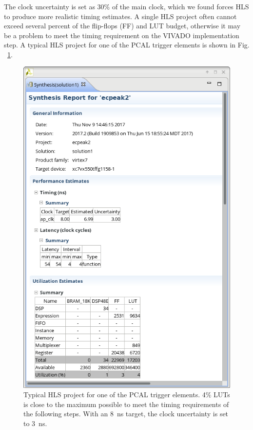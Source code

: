 The clock uncertainty is set as 30\% of the main clock, which we found forces HLS to produce more realistic
timing estimates. A single HLS project often cannot exceed several percent of the flip-flops (FF) and LUT
budget, otherwise it may be a problem to meet the timing requirement on the VIVADO implementation step.
A typical HLS project for one of the PCAL trigger elements is shown in Fig. ~\ref{fig:hls}.

\begin{figure}[hbt]
	\centering
	\includegraphics[width=1.0\columnwidth,keepaspectratio]{img/hls.png}
	\caption{Typical HLS project for one of the PCAL trigger elements. 4\% LUTs is close to the maximum
          possible to meet the timing requirements of the following steps. With an 8~ns target, the clock uncertainty
          is set to 3~ns.}
	\label{fig:hls}
\end{figure}

